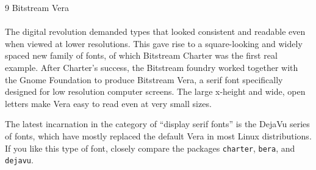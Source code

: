 \documentclass{article}
\begin{document}
\frenchspacing
\noindent
{\LARGE 9 Bitstream Vera}\\
~\\
The digital revolution demanded types that looked consistent and readable even when viewed at lower resolutions. This gave rise to a square-looking and widely spaced new family of fonts, of which Bitstream Charter was the first real example. After Charter's success, the Bitstream foundry worked together with the Gnome Foundation to produce Bitstream Vera, a serif font specifically designed for low resolution computer screens. The large x-height and wide, open letters make Vera easy to read even at very small sizes.

The latest incarnation in the category of ``display serif fonts'' is the DejaVu series of fonts, which have mostly replaced the default Vera in most Linux distributions. If you like this type of font, closely compare the packages \texttt{charter}, \texttt{bera}, and \texttt{dejavu}.
\end{document}

